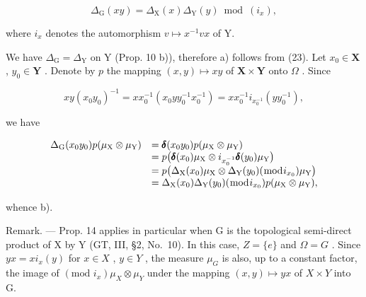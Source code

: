 \[
\Delta_ {\mathrm{G}} (x y) = \Delta_ {\mathrm{X}} (x) \Delta_ {\mathrm{Y}} (y) \bmod (i _ {x}),
\]

where \(i_x\) denotes the automorphism \(v \mapsto x^{-1}vx\) of Y.

We have \(\Delta_{\mathrm{G}} = \Delta_{\mathrm{Y}}\) on Y (Prop. 10 b)), therefore a) follows from (23). Let \(x_0 \in \mathbf{X}\) , \(y_0 \in \mathbf{Y}\) . Denote by \(p\) the mapping \((x, y) \mapsto xy\) of \(\mathbf{X} \times \mathbf{Y}\) onto \(\Omega\) . Since

\[
x y \left(x _ {0} y _ {0}\right) ^ {- 1} = x x _ {0} ^ {- 1} \left(x _ {0} y y _ {0} ^ {- 1} x _ {0} ^ {- 1}\right) = x x _ {0} ^ {- 1} i _ {x _ {0} ^ {- 1}} \left(y y _ {0} ^ {- 1}\right),
\]

we have

\[
\begin{array}{r l} \Delta_ {\mathrm{G}} (x _ {0} y _ {0}) p (\mu_ {\mathrm{X}} \otimes \mu_ {\mathrm{Y}}) & = \pmb {\delta} (x _ {0} y _ {0}) p (\mu_ {\mathrm{X}} \otimes \mu_ {\mathrm{Y}}) \\ & = p \big (\pmb {\delta} (x _ {0}) \mu_ {\mathrm{X}} \otimes i _ {x _ {0} ^ {- 1}} \pmb {\delta} (y _ {0}) \mu_ {\mathrm{Y}} \big) \\ & = p \big (\Delta_ {\mathrm{X}} (x _ {0}) \mu_ {\mathrm{X}} \otimes \Delta_ {\mathrm{Y}} (y _ {0}) (\bmod i _ {x _ {0}}) \mu_ {\mathrm{Y}} \big) \\ & = \Delta_ {\mathrm{X}} (x _ {0}) \Delta_ {\mathrm{Y}} (y _ {0}) (\bmod i _ {x _ {0}}) p (\mu_ {\mathrm{X}} \otimes \mu_ {\mathrm{Y}}), \end{array}
\]

whence b).

Remark. --- Prop. 14 applies in particular when G is the topological semi-direct product of X by Y (GT, III, §2, No.~10). In this case, \(Z = \{e\}\) and \(\Omega = G\) . Since \(yx = x i_{x}(y)\) for \(x \in X\) , \(y \in Y\) , the measure \(\mu_{G}\) is also, up to a constant factor, the image of \((\text{mod } i_{x})\mu_{X} \otimes \mu_{Y}\) under the mapping \((x, y) \mapsto yx\) of \(X \times Y\) into G.

